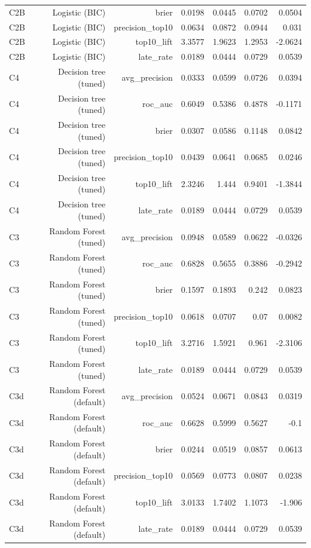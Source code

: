 \begin{table}[htbp]
\begin{tabular}{lrrrrrr}
C2B & Logistic (BIC) & brier & 0.0198 & 0.0445 & 0.0702 & 0.0504 \\
C2B & Logistic (BIC) & precision\_top10 & 0.0634 & 0.0872 & 0.0944 & 0.031 \\
C2B & Logistic (BIC) & top10\_lift & 3.3577 & 1.9623 & 1.2953 & -2.0624 \\
C2B & Logistic (BIC) & late\_rate & 0.0189 & 0.0444 & 0.0729 & 0.0539 \\
C4 & Decision tree (tuned) & avg\_precision & 0.0333 & 0.0599 & 0.0726 & 0.0394 \\
C4 & Decision tree (tuned) & roc\_auc & 0.6049 & 0.5386 & 0.4878 & -0.1171 \\
C4 & Decision tree (tuned) & brier & 0.0307 & 0.0586 & 0.1148 & 0.0842 \\
C4 & Decision tree (tuned) & precision\_top10 & 0.0439 & 0.0641 & 0.0685 & 0.0246 \\
C4 & Decision tree (tuned) & top10\_lift & 2.3246 & 1.444 & 0.9401 & -1.3844 \\
C4 & Decision tree (tuned) & late\_rate & 0.0189 & 0.0444 & 0.0729 & 0.0539 \\
C3 & Random Forest (tuned) & avg\_precision & 0.0948 & 0.0589 & 0.0622 & -0.0326 \\
C3 & Random Forest (tuned) & roc\_auc & 0.6828 & 0.5655 & 0.3886 & -0.2942 \\
C3 & Random Forest (tuned) & brier & 0.1597 & 0.1893 & 0.242 & 0.0823 \\
C3 & Random Forest (tuned) & precision\_top10 & 0.0618 & 0.0707 & 0.07 & 0.0082 \\
C3 & Random Forest (tuned) & top10\_lift & 3.2716 & 1.5921 & 0.961 & -2.3106 \\
C3 & Random Forest (tuned) & late\_rate & 0.0189 & 0.0444 & 0.0729 & 0.0539 \\
C3d & Random Forest (default) & avg\_precision & 0.0524 & 0.0671 & 0.0843 & 0.0319 \\
C3d & Random Forest (default) & roc\_auc & 0.6628 & 0.5999 & 0.5627 & -0.1 \\
C3d & Random Forest (default) & brier & 0.0244 & 0.0519 & 0.0857 & 0.0613 \\
C3d & Random Forest (default) & precision\_top10 & 0.0569 & 0.0773 & 0.0807 & 0.0238 \\
C3d & Random Forest (default) & top10\_lift & 3.0133 & 1.7402 & 1.1073 & -1.906 \\
C3d & Random Forest (default) & late\_rate & 0.0189 & 0.0444 & 0.0729 & 0.0539 \\
\bottomrule
\end{tabular}
\par\smallskip\begin{minipage}{\linewidth}\footnotesize \end{minipage}
\end{table}

